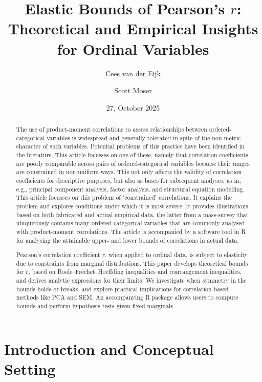 \documentclass[
  12pt,
]{article}
\title{Elastic Bounds of Pearson's \(r\): Theoretical and Empirical
Insights for Ordinal Variables}
\author{Cees van der Eijk \and Scott Moser}
\date{27, October 2025}
\theoremstyle{plain}
\theoremstyle{definition}
\renewcommand*\contentsname{Table of contents}
\newcommand\contentsname{Table of contents}
\theoremstyle{remark}
\begin{document}
\maketitle

\renewcommand*\contentsname{Table of contents}
{
\hypersetup{linkcolor=}
\setcounter{tocdepth}{3}
\tableofcontents
}

\newpage

\begin{abstract}
The use of product-moment correlations to assess relationships between ordered-categorical variables is widespread and generally tolerated in spite of the non-metric character of such variables. Potential problems of this practice have been identified in the literature. This article focusses on one of these, namely that correlation coefficients are poorly comparable across pairs of ordered-categorical variables because their ranges are constrained in non-uniform ways. This not only affects the validity of correlation coefficients for descriptive purposes, but also as bases for subsequent analyses, as in, e.g., principal component analysis, factor analysis, and structural equation modelling. This article focusses on this problem of ‘constrained’ correlations. It explains the problem and explores conditions under which it is most severe. It provides illustrations based on both fabricated and actual empirical data, the latter from a mass-survey that ubiquitously contains many ordered-categorical variables that are commonly analysed with product-moment correlations. The article is accompanied by a software tool in R for analysing the attainable upper- and lower bounds of correlations in actual data. 

Pearson’s correlation coefficient $r$, when applied to ordinal data, is subject to elasticity due to constraints from marginal distributions. This paper develops theoretical bounds for $r$, based on Boole–Fréchet–Hoeffding inequalities and rearrangement inequalities, and derives analytic expressions for their limits. We investigate when symmetry in the bounds holds or breaks, and explore practical implications for correlation-based methods like PCA and SEM. An accompanying R package allows users to compute bounds and perform hypothesis tests given fixed marginals.
\end{abstract}

\newpage

\newpage

\section{Introduction and Conceptual
Setting}\label{introduction-and-conceptual-setting}
\end{document}
